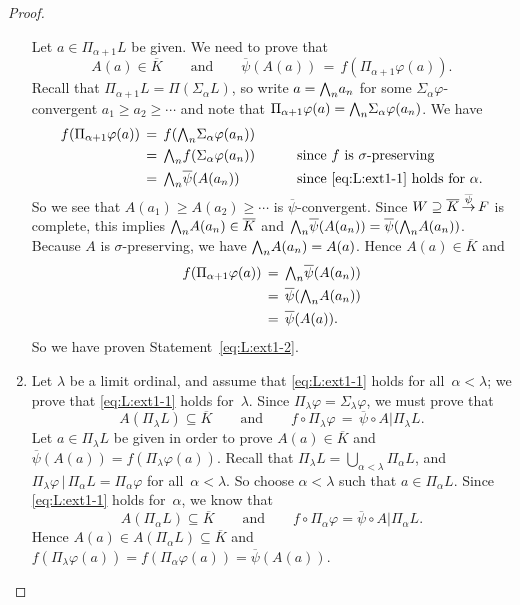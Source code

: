 \documentclass[main.tex]{subfiles}
\begin{document}
\begin{proof}
\begin{enumerate}
Let $a\in \Pi_{\alpha+1} L$
be given. We need to prove that
\begin{equation}
\label{eq:L:ext1-2}
A(a)\in \overline{K}\qquad\text{and}\qquad
\overline\psi (A(a)) \,=\, f(\Pi_{\alpha+1}\varphi(a)).
\end{equation}
Recall that $\Pi_{\alpha+1}L = \Pi(\Sigma_\alpha L)$,
so write $a=\textstyle{\bigwedge}_n a_n$
for some 
$\Sigma_\alpha \varphi$-convergent
$a_1 \geq a_2 \geq \dotsb$
and note that $\Pi_{\alpha+1}\varphi (a) = \textstyle{\bigwedge}_n \Sigma_\alpha\varphi(a_n)$.
We have
\begin{alignat*}{3} 
f(\Pi_{\alpha+1}\varphi(a))
 \,&=\, f(\textstyle{\bigwedge}_n \Sigma_\alpha \varphi (a_n))
   && \\
 \,&=\, \textstyle{\bigwedge}_n f(\Sigma_\alpha\varphi(a_n))\qquad
   && \text{since $f$ is $\sigma$-preserving} \\
 \,&=\, \textstyle{\bigwedge}_n \overline{\psi} (A( a_n )) 
   && \text{since \eqref{eq:L:ext1-1} holds for~$\alpha$.} 
\end{alignat*}
So we see that $A(a_1)\geq A(a_2)\geq \dotsb$
is $\overline{\psi}$-convergent.
Since $W \supseteq \overline{K}\,\smash{\stackrel{\overline{\psi}}{\rightarrow}}\,F$ is complete,
this implies $\textstyle{\bigwedge}_n A(a_n) \in \overline{K}$
and $\textstyle{\bigwedge}_n\overline{\psi}(A(a_n))=\overline{\psi}(\textstyle{\bigwedge}_n A(a_n))$.
Because $A$ is $\sigma$-preserving,
we have $\textstyle{\bigwedge}_n A(a_n) = A(a)$.
Hence $A(a)\in \overline{K}$
and 
\begin{alignat*}{3}
f(\Pi_{\alpha+1}\varphi(a))
 \,&=\,  \textstyle{\bigwedge}_n \overline{\psi}(A(a_n)) \\
 \,&=\,  \overline{\psi} (\textstyle{\bigwedge}_n A(a_n)) \\
 \,&=\,  \overline{\psi} (A(a)).
\end{alignat*}
So we have proven Statement~\eqref{eq:L:ext1-2}.

\item
Let $\lambda$ be a limit ordinal,
and assume that \eqref{eq:L:ext1-1}
holds for all~$\alpha<\lambda$;
we prove that \eqref{eq:L:ext1-1} holds for~$\lambda$.
Since  $\Pi_\lambda \varphi = \Sigma_\lambda \varphi$,
we must prove that
\begin{equation}
A(\Pi_\lambda L)\subseteq \overline K
\qquad\text{and}\qquad
f\circ \Pi_\lambda \varphi \,=\, \overline\psi \circ A | \Pi_\lambda L.
\end{equation}
Let $a\in \Pi_\lambda L$ be given
in order to prove $A(a)\in \overline{K}$
and $\overline\psi(A(a))= f(\Pi_\lambda\varphi(a))$.
Recall that $\Pi_\lambda L = \bigcup_{\alpha < \lambda} \Pi_\alpha L$,
and $\Pi_\lambda \varphi \,|\,\Pi_\alpha L = \Pi_\alpha \varphi$
for all~$\alpha < \lambda$.
So choose $\alpha < \lambda$ such that
$a\in \Pi_\alpha L$.
Since \eqref{eq:L:ext1-1} holds for~$\alpha$,
we know that 
\begin{equation*}
A(\Pi_\alpha L) \subseteq \overline K
\qquad\text{and}\qquad
f\circ \Pi_\alpha \varphi = \overline\psi\circ A | \Pi_\alpha L.
\end{equation*}
Hence $A(a) \in A(\Pi_\alpha L) \subseteq \overline K$ and 
$f(\Pi_\lambda \varphi(a)) = f(\Pi_\alpha \varphi(a)) =
\overline\psi(A(a))$.\qedhere
\end{enumerate}
\end{proof}
\end{document}
